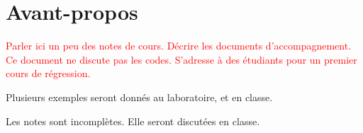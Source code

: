 \chapter*{Avant-propos}         %

\textcolor{red}{Parler ici un peu des notes de cours. Décrire les documents d'accompagnement. Ce document ne discute pas les codes. S'adresse à des étudiants pour un premier cours de régression.}

Plusieurs exemples seront donnés au laboratoire, et en classe. 

Les notes sont incomplètes. Elle seront discutées en classe. 